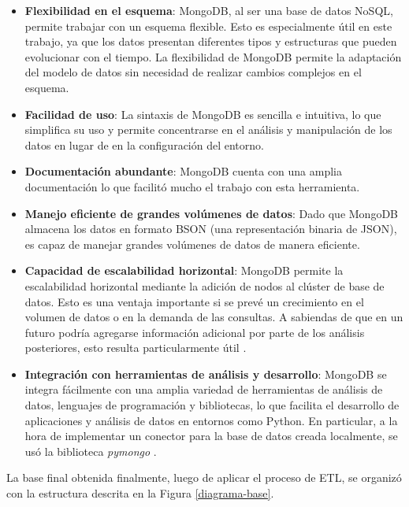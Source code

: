 \documentclass[11pt,a4paper,twoside,openany]{tesis}
\begin{document}
\begin{itemize}
    \item \textbf{Flexibilidad en el esquema}: MongoDB, al ser una base de datos NoSQL, permite trabajar con un esquema flexible. Esto es especialmente útil en este trabajo, ya que los datos presentan diferentes tipos y estructuras que pueden evolucionar con el tiempo. La flexibilidad de MongoDB permite la adaptación del modelo de datos sin necesidad de realizar cambios complejos en el esquema.
    
    \item \textbf{Facilidad de uso}: La sintaxis de MongoDB es sencilla e intuitiva, lo que simplifica su uso y permite concentrarse en el análisis y manipulación de los datos en lugar de en la configuración del entorno.
    
    \item \textbf{Documentación abundante}: MongoDB cuenta con una amplia documentación lo que facilitó mucho el trabajo con esta herramienta. 
    
    \item \textbf{Manejo eficiente de grandes volúmenes de datos}: Dado que MongoDB almacena los datos en formato BSON (una representación binaria de JSON), es capaz de manejar grandes volúmenes de datos de manera eficiente.
    
    \item \textbf{Capacidad de escalabilidad horizontal}: MongoDB permite la escalabilidad horizontal mediante la adición de nodos al clúster de base de datos. Esto es una ventaja importante si se prevé un crecimiento en el volumen de datos o en la demanda de las consultas. A sabiendas de que en un futuro podría agregarse información adicional por parte de los análisis posteriores, esto resulta particularmente útil \cite{MongoDB-docs}.
    
    \item \textbf{Integración con herramientas de análisis y desarrollo}: MongoDB se integra fácilmente con una amplia variedad de herramientas de análisis de datos, lenguajes de programación y bibliotecas, lo que facilita el desarrollo de aplicaciones y análisis de datos en entornos como Python. En particular, a la hora de implementar un conector para la base de datos creada localmente, se usó la biblioteca \emph{pymongo} \cite{pymongo}.
\end{itemize}

La base final obtenida finalmente, luego de aplicar el proceso de  ETL, se organizó con la estructura descrita en la Figura \ref{diagrama-base}.
\end{document}
